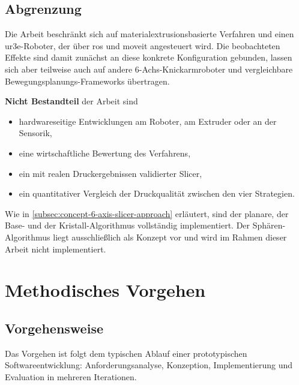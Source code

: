         \subsection{Abgrenzung}\label{subsec:scope-delimitation}
            Die Arbeit beschränkt sich auf materialextrusionsbasierte Verfahren und einen \ac{ur3e}-Roboter, der über \ac{ros} und \ac{moveit} angesteuert wird.
            Die beobachteten Effekte sind damit zunächst an diese konkrete Konfiguration gebunden, lassen sich aber teilweise auch auf andere 6-Achs-Knickarmroboter und vergleichbare Bewegungsplanungs-Frameworks übertragen.

            \textbf{Nicht Bestandteil} der Arbeit sind
            \begin{itemize}
                \item hardwareseitige Entwicklungen am Roboter, am Extruder oder an der Sensorik,
                \item eine wirtschaftliche Bewertung des Verfahrens,
                \item ein mit realen Druckergebnissen validierter Slicer,
                \item ein quantitativer Vergleich der Druckqualität zwischen den vier Strategien.
            \end{itemize}

            Wie in \cref{subsec:concept-6-axis-slicer-approach} erläutert, sind der planare, der Base- und der Kristall-Algorithmus vollständig implementiert.
            Der Sphären-Algorithmus liegt ausschließlich als Konzept vor und wird im Rahmen dieser Arbeit nicht implementiert.

    \section{Methodisches Vorgehen}\label{sec:methodological-approach}
        \subsection{Vorgehensweise}\label{subsec:research-design-and-development-strategy}
            Das Vorgehen ist folgt dem typischen Ablauf einer prototypischen Softwareentwicklung: Anforderungsanalyse, Konzeption, Implementierung und Evaluation in mehreren Iterationen.

